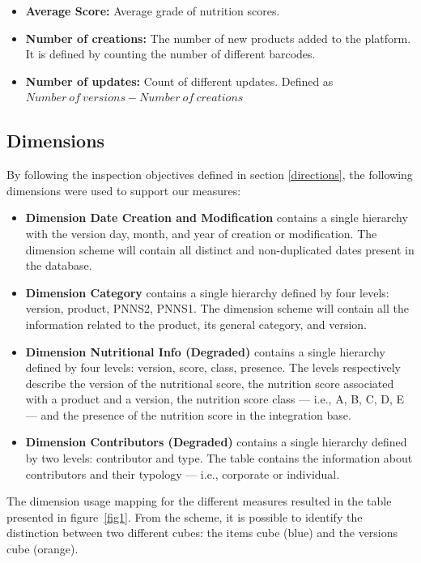 \documentclass[runningheads]{llncs}
\begin{document}
\begin{itemize}
    \item \textbf{Average Score:} Average grade of nutrition scores.
    \item \textbf{Number of creations:} The number of new products added to the platform. It is defined by counting the number of different barcodes.
    \item \textbf{Number of updates:} Count of different updates. Defined as $Number \ of \ versions - Number \ of \ creations$
\end{itemize}

\subsection{Dimensions}\label{dim}
By following the inspection objectives defined in section \ref{directions}, the following dimensions were used to support our measures:

\begin{itemize}
  \item \textbf{Dimension Date Creation and Modification} contains a single hierarchy with the version day, month, and year of creation or modification. The dimension scheme will contain all distinct and non-duplicated dates present in the database.
  \item \textbf{Dimension Category} contains a single hierarchy defined by four levels: version, product, PNNS2, PNNS1. The dimension scheme will contain all the information related to the product, its general category, and version.
  \item\textbf{Dimension Nutritional Info (Degraded)} contains a single hierarchy defined by four levels: version, score, class, presence. The levels respectively describe the version of the nutritional score, the nutrition score associated with a product and a version, the nutrition score class — i.e., A, B, C, D, E — and the presence of the nutrition score in the integration base.
  \item\textbf{Dimension Contributors (Degraded)} contains a single hierarchy defined by two levels: contributor and type. The table contains the information about contributors and their typology — i.e., corporate or individual.
\end{itemize}

The dimension usage mapping for the different measures resulted in the table presented in figure~\ref{fig1}. From the scheme, it is possible to identify the distinction between two different cubes: the items cube (blue) and the versions cube (orange). 
\end{document}
